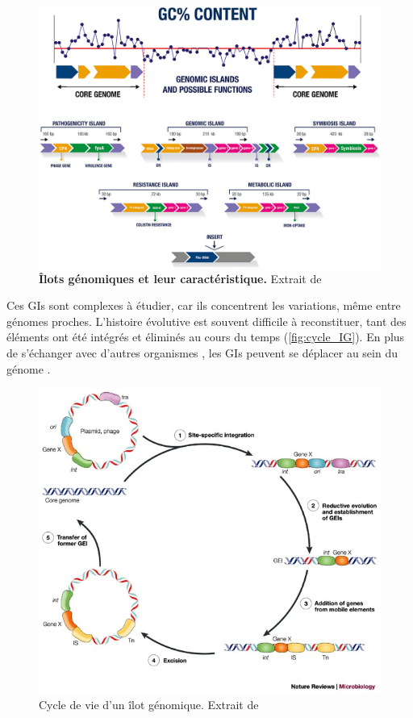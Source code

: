 \begin{figure}[htbp]
    \centering
    \includegraphics[width=0.8\linewidth]{images/ilot_genomique.jpg}
    \caption[Îlots génomiques et leur caractéristique]{\textbf{Îlots génomiques et leur caractéristique.} Extrait de  \cite{da_silva_filho_comparative_2018}}
    \label{fig:GI}
\end{figure}

\newpage
Ces GIs sont complexes à étudier, car ils concentrent les variations, même entre génomes proches. L'histoire évolutive est souvent difficile à reconstituer, tant des éléments ont été intégrés et éliminés au cours du temps (\autoref{fig:cycle_IG}). En plus de s'échanger avec d'autres organismes \cite{buchrieser_high-pathogenicity_1998}, les GIs peuvent se déplacer au sein du génome \cite{karaolis_bacteriophage_1999}.

\begin{figure}[htbp]
    \centering
    \includegraphics[width=0.65\linewidth]{images/cycle_GI.png}
    \caption[Cycle de vie d'un îlot génomique]{Cycle de vie d'un îlot génomique. Extrait de \cite{dobrindt_genomic_2004}}
    \label{fig:cycle_IG}
\end{figure}

